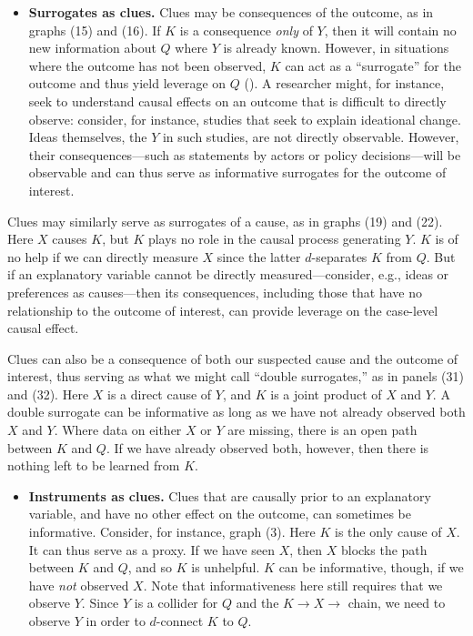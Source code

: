 \documentclass[12pt,]{book}
\providecommand{\tightlist}{%
  \setlength{\itemsep}{0pt}\setlength{\parskip}{0pt}}
\begin{document}
\begin{itemize}
\tightlist
\item
  \textbf{Surrogates as clues.} Clues may be consequences of the outcome, as in graphs (15) and (16). If \(K\) is a consequence \emph{only} of \(Y\), then it will contain no new information about \(Q\) where \(Y\) is already known. However, in situations where the outcome has not been observed, \(K\) can act as a ``surrogate'' for the outcome and thus yield leverage on \(Q\) (\citet{frangakis2002principal}). A researcher might, for instance, seek to understand causal effects on an outcome that is difficult to directly observe: consider, for instance, studies that seek to explain ideational change. Ideas themselves, the \(Y\) in such studies, are not directly observable. However, their consequences---such as statements by actors or policy decisions---will be observable and can thus serve as informative surrogates for the outcome of interest.
\end{itemize}

Clues may similarly serve as surrogates of a cause, as in graphs (19) and (22). Here \(X\) causes \(K\), but \(K\) plays no role in the causal process generating \(Y\). \(K\) is of no help if we can directly measure \(X\) since the latter \(d\)-separates \(K\) from \(Q\). But if an explanatory variable cannot be directly measured---consider, e.g., ideas or preferences as causes---then its consequences, including those that have no relationship to the outcome of interest, can provide leverage on the case-level causal effect.

Clues can also be a consequence of both our suspected cause and the outcome of interest, thus serving as what we might call ``double surrogates,'' as in panels (31) and (32). Here \(X\) is a direct cause of \(Y\), and \(K\) is a joint product of \(X\) and \(Y\). A double surrogate can be informative as long as we have not already observed both \(X\) and \(Y\). Where data on either \(X\) or \(Y\) are missing, there is an open path between \(K\) and \(Q\). If we have already observed both, however, then there is nothing left to be learned from \(K\).

\begin{itemize}
\tightlist
\item
  \textbf{Instruments as clues.} Clues that are causally prior to an explanatory variable, and have no other effect on the outcome, can sometimes be informative. Consider, for instance, graph (3). Here \(K\) is the only cause of \(X\). It can thus serve as a proxy. If we have seen \(X\), then \(X\) blocks the path between \(K\) and \(Q\), and so \(K\) is unhelpful. \(K\) can be informative, though, if we have \emph{not} observed \(X\). Note that informativeness here still requires that we observe \(Y\). Since \(Y\) is a collider for \(Q\) and the \(K \rightarrow X \rightarrow\) chain, we need to observe \(Y\) in order to \(d\)-connect \(K\) to \(Q\).
\end{itemize}
\end{document}
